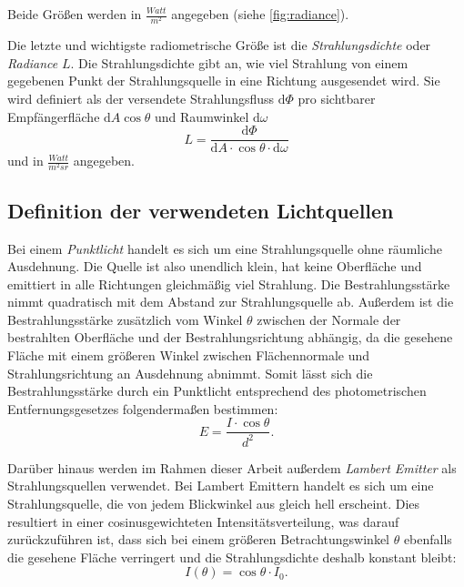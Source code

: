 \documentclass[thesis.tex]{subfiles}
\begin{document}
Beide Größen werden in $\frac{Watt}{m^2}$ angegeben (siehe \autoref{fig:radiance}). 

Die letzte und wichtigste radiometrische Größe ist die \emph{Strahlungsdichte} oder \emph{Radiance} $L$. Die Strahlungsdichte gibt an, wie viel Strahlung von einem gegebenen Punkt der Strahlungsquelle in eine Richtung ausgesendet wird. Sie wird definiert als der versendete Strahlungsfluss $\mathrm{d}\Phi$ pro sichtbarer Empfängerfläche $\mathrm{d}A \cos\theta$ und Raumwinkel $\mathrm{d}\omega$
\begin{equation}
L = \frac{\mathrm{d}\Phi}{\mathrm{d}A \cdot \cos \theta \cdot \mathrm{d}\omega}
\end{equation}
und in $\frac{Watt}{m^2sr}$ angegeben.

\subsection{Definition der verwendeten Lichtquellen}

Bei einem \emph{Punktlicht} handelt es sich um eine Strahlungsquelle ohne räumliche Ausdehnung. Die Quelle ist also unendlich klein, hat keine Oberfläche und emittiert in alle Richtungen gleichmäßig viel Strahlung. Die Bestrahlungsstärke nimmt quadratisch mit dem Abstand zur Strahlungsquelle ab. Außerdem ist die Bestrahlungsstärke zusätzlich vom Winkel $\theta$ zwischen der Normale der bestrahlten Oberfläche und der Bestrahlungsrichtung abhängig, da die \glq gesehene\grq{} Fläche mit einem größeren Winkel zwischen Flächennormale und Strahlungsrichtung an Ausdehnung abnimmt. Somit lässt sich die Bestrahlungsstärke durch ein Punktlicht entsprechend des photometrischen Entfernungsgesetzes folgendermaßen bestimmen:
\begin{equation}
E = \frac{I \cdot \cos\theta}{d^2}.
\end{equation}

Darüber hinaus werden im Rahmen dieser Arbeit außerdem \emph{Lambert Emitter} als Strahlungsquellen verwendet. Bei Lambert Emittern handelt es sich um eine Strahlungsquelle, die von jedem Blickwinkel aus gleich hell erscheint. Dies resultiert in einer cosinusgewichteten Intensitätsverteilung, was darauf zurückzuführen ist, dass sich bei einem größeren Betrachtungswinkel $\theta$ ebenfalls die \glq gesehene\grq{} Fläche verringert und die Strahlungsdichte deshalb konstant bleibt:
\begin{equation}
I(\theta) = \cos\theta \cdot I_0.
\end{equation}
\end{document}
